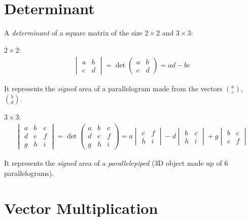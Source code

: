\documentclass[00_complete]{subfiles}
\begin{document}
\section{Determinant}

A \emph{determinant} of a square matrix of the size $2\times2$ and $3\times3$:

$2\times2$:
$$
\begin{gathered}
    \begin{vmatrix}
        a & b \\
        c & d
    \end{vmatrix} = \det \begin{pmatrix}
        a & b \\
        c & d
    \end{pmatrix} = ad - bc
\end{gathered}
$$

It represents the \emph{signed} area of a parallelogram made from the vectors $\binom{a}{c}$,
$\binom{b}{d}$.

$3\times3$:
$$
\begin{gathered}
    \begin{vmatrix}
        a & b & c \\
        d & e & f \\
        g & h & i
    \end{vmatrix} = \det \begin{pmatrix}
        a & b & c \\
        d & e & f \\
        g & h & i
    \end{pmatrix} = a \begin{vmatrix}
        e & f \\ h & i
    \end{vmatrix} - d \begin{vmatrix}
        b & c \\ h & i
    \end{vmatrix} + g \begin{vmatrix}
        b & c \\ e & f
    \end{vmatrix}
\end{gathered}
$$

It represents the \emph{signed} area of a \emph{parallelepiped} (3D object made up of 6
parallelograms).

\section{Vector Multiplication}
\end{document}
